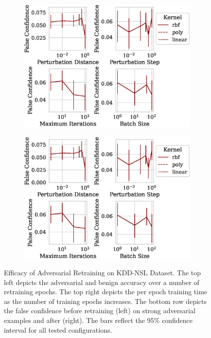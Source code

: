 \documentclass[fonts]{icst}
\begin{document}
\begin{appendices}
\begin{figure}[h!]
\begin{subfigure}{0.47\textwidth}
     \end{subfigure}
     \hfill
     \begin{subfigure}{0.47\textwidth}
         \centering
         \includegraphics[width=\textwidth]{./kdd-nsl/confidence_vs_attack_parameters.eps}
     \end{subfigure}
     \hfill
     \begin{subfigure}{0.47\textwidth}
         \centering
         \includegraphics[width=\textwidth]{./kdd-nsl/retrain_confidence_vs_attack_parameters.eps}
     \end{subfigure}
     \hfill
     \caption{Efficacy of Adversarial Retraining on KDD-NSL Dataset.
The top left depicts the adversarial and benign accuracy over a number of retraining epochs.
The top right depicts the per epoch training time as the number of training epochs increases.
The bottom row depicts the false confidence before retraining (left) on strong adversarial examples and after (right).
The bars reflect the 95\% confidence interval for all tested configurations.}
     \label{fig:kdd-nsl}
\end{figure}
\pagebreak
\onecolumn

\end{appendices}
\end{document}
